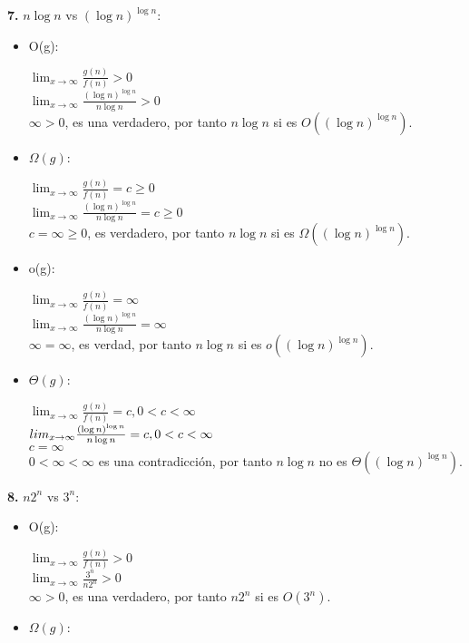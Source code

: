 \documentclass{article}
\begin{document}
\begin{enumerate}[label=\textbf{\alph*.}]
  
  \textbf{7.} $n\log n$ vs $(\log n)^{\log n}$:
    \begin{itemize}
      \item O(g):
      
        $\lim_{x\to\infty} \frac{g(n)}{f(n)}>0$\\
        $\lim_{x\to\infty} \frac{(\log n)^{\log n}}{n\log n}>0$\\
        $\infty>0$, es una verdadero, por tanto $n\log n$ si es $O((\log n)^{\log n})$.

      \item $\Omega(g)$:
      
        $\lim_{x\to\infty} \frac{g(n)}{f(n)}=c \geq 0$\\
        $\lim_{x\to\infty} \frac{(\log n)^{\log n}}{n\log n}=c \geq 0$\\
        $c=\infty \geq 0$, es verdadero, por tanto $n\log n$ si es $\Omega((\log n)^{\log n})$.

      \item o(g):
      
        $\lim_{x\to\infty} \frac{g(n)}{f(n)}=\infty$\\
        $\lim_{x\to\infty} \frac{(\log n)^{\log n}}{n\log n}=\infty$\\
        $\infty=\infty$, es verdad, por tanto $n\log n$ si es $o((\log n)^{\log n})$.

      \item $\Theta(g)$:
      
        $\lim_{x\to\infty} \frac{g(n)}{f(n)}=c,0<c<\infty$\\
        $\\lim_{x\to\infty} \frac{(\log n)^{\log n}}{n\log n}=c,0<c<\infty$\\
        $c=\infty$\\
	$0<\infty<\infty$ es una contradicción, por tanto $n\log n$ no es $\Theta((\log n)^{\log n})$.
    \end{itemize}

  
  \textbf{8.} $n2^n$ vs $3^n$:    \begin{itemize}
      \item O(g):
      
        $\lim_{x\to\infty} \frac{g(n)}{f(n)}>0$\\
        $\lim_{x\to\infty} \frac{3^n}{n2^n}>0$\\
        $\infty>0$, es una verdadero, por tanto $n2^n$ si es $O(3^n)$.

      \item $\Omega(g)$:
      

\end{itemize}
\end{enumerate}
\end{document}
